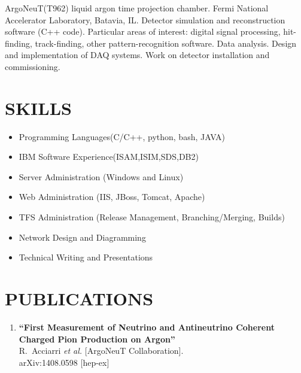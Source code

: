 \documentclass{res}
\begin{document}
\begin{resume}
	ArgoNeuT(T962) liquid argon time projection chamber. Fermi National Accelerator Laboratory, Batavia, IL.  Detector simulation and reconstruction software (C++ code).  Particular areas of interest: digital signal processing, hit-finding, track-finding, other pattern-recognition software. Data analysis.  Design and implementation of DAQ systems.  Work on detector installation and commissioning. 
	
\section{SKILLS}
\vspace{0.1in}

	\begin{itemize}
	  \item Programming Languages(C/C++, python, bash, JAVA)
	  \item IBM Software Experience(ISAM,ISIM,SDS,DB2)
	  \item Server Administration (Windows and Linux)
          \item Web Administration (IIS, JBoss, Tomcat, Apache)  
	  \item TFS Administration (Release Management, Branching/Merging, Builds) 
          \item Network Design and Diagramming
	  \item Technical Writing and Presentations
	\end{itemize} 
    
\section{PUBLICATIONS}
\vspace{0.3in}
\author{}
\date{}
\begin{enumerate}  \itemsep10pt


\item%
{\bf ``First Measurement of Neutrino and Antineutrino Coherent Charged Pion Production on Argon''}
  \\{}R.~Acciarri {\it et al.}  [ArgoNeuT Collaboration].
  \\{}arXiv:1408.0598 [hep-ex]
  

\end{enumerate}
\end{resume}
\end{document}
